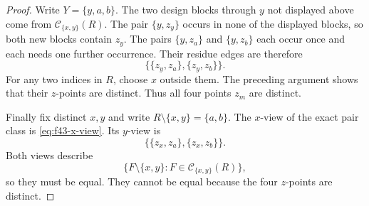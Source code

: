 \documentclass[10pt,a4paper]{amsart}
\newcommand{\C}{\mathcal C}
\begin{document}
\begin{proof}
Write $Y=\{y,a,b\}$. The two design blocks through $y$ not displayed above
come from $\C_{\{x,y\}}(R)$. The pair $\{y,z_y\}$ occurs in none of the
displayed blocks, so both new blocks contain $z_y$. The pairs
$\{y,z_a\}$ and $\{y,z_b\}$ each occur once and each needs one further
occurrence. Their residue edges are therefore
\begin{equation}
 \bigl\{\{z_y,z_a\},\{z_y,z_b\}\bigr\}.
 \label{eq:f43-x-view}
\end{equation}
For any two indices in $R$, choose $x$ outside them. The preceding argument
shows that their $z$-points are distinct. Thus all four points $z_m$ are
distinct.

Finally fix distinct $x,y$ and write $R\setminus\{x,y\}=\{a,b\}$. The
$x$-view of the exact pair class is \cref{eq:f43-x-view}. Its $y$-view is
\[
 \bigl\{\{z_x,z_a\},\{z_x,z_b\}\bigr\}.
\]
Both views describe
\[
 \{F\setminus\{x,y\}:F\in\C_{\{x,y\}}(R)\},
\]
so they must be equal. They cannot be equal because the four $z$-points are
distinct.
\end{proof}
\end{document}
